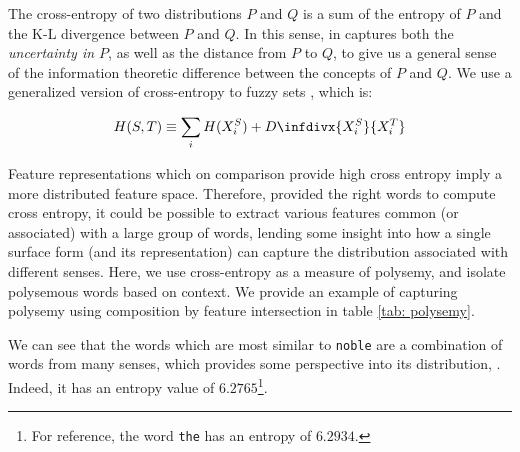 \documentclass[11pt,a4paper]{article}
\newcommand{\infdiv}{D\infdivx}
\begin{document}
The cross-entropy of two distributions $P$ and $Q$ is a sum of the entropy of $P$ and the K-L divergence between $P$ and $Q$. In this sense, in captures both the \emph{uncertainty in $P$}, as well as the distance from $P$ to $Q$, to give us a general sense of the information theoretic difference between the concepts of $P$ and $Q$. We use a generalized version of cross-entropy to fuzzy sets \citep{li2015fuzzy}, which is:

{\footnotesize
\begin{equation*}
   H(S, T) \equiv \sum_i H(X^S_i) + \infdiv{X^S_i}{X^T_i}
\end{equation*}
}

Feature representations which on comparison provide high cross entropy imply a more distributed feature space. Therefore, provided the right words to compute cross entropy, it could be possible to extract various features common (or associated) with a large group of words, lending some insight into how a single surface form (and its representation) can capture the distribution associated with different senses. Here, we use cross-entropy as a measure of polysemy, and isolate polysemous words based on context. We provide an example of capturing polysemy using composition by feature intersection in table \ref{tab: polysemy}. 

We can see that the words which are most similar to \texttt{noble} are a combination of words from many senses, which provides some perspective into its distribution, . Indeed, it has an entropy value of $6.2765$\footnote{For reference, the word \texttt{the} has an entropy of $6.2934$.}.
\end{document}
